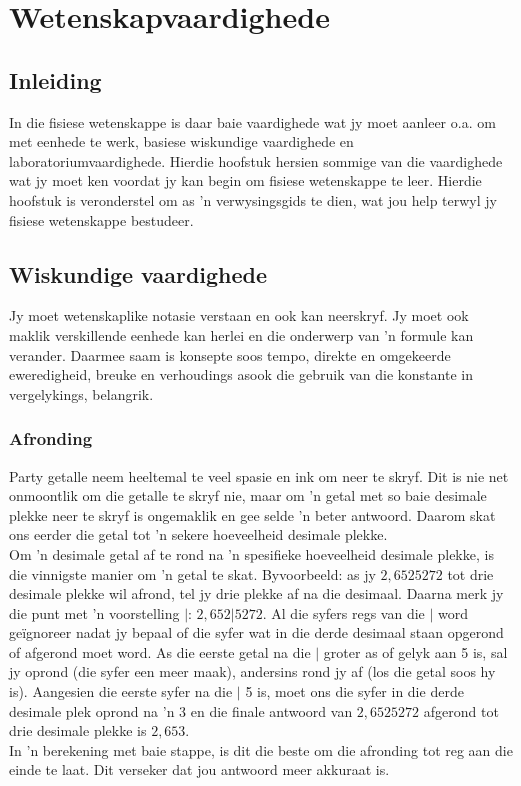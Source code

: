          \chapter{Wetenskapvaardighede}
    \setcounter{figure}{1}\setcounter{subfigure}{1}\label{m30853}
    \section{Inleiding}
            \nopagebreak
In die fisiese wetenskappe is daar baie vaardighede wat jy moet aanleer o.a. om met eenhede te werk, basiese wiskundige vaardighede en laboratoriumvaardighede. Hierdie hoofstuk hersien sommige van die vaardighede wat jy moet ken voordat jy kan begin om fisiese wetenskappe te leer. Hierdie hoofstuk is veronderstel om as  'n verwysingsgids te dien, wat jou help terwyl jy fisiese wetenskappe bestudeer. 
\section{Wiskundige vaardighede}
Jy moet wetenskaplike notasie verstaan en ook kan neerskryf. Jy moet ook maklik verskillende eenhede kan herlei en die onderwerp van  'n formule kan verander. Daarmee saam is konsepte soos tempo, direkte en omgekeerde eweredigheid, breuke en verhoudings asook die gebruik van die konstante in vergelykings, belangrik.  
\subsection*{Afronding}
Party getalle neem heeltemal te veel spasie en ink om neer te skryf. Dit is nie net onmoontlik om die getalle te skryf nie, maar om  'n getal met so baie desimale plekke neer te skryf is ongemaklik en gee selde  'n beter antwoord. Daarom skat ons eerder die getal tot  'n sekere hoeveelheid desimale plekke. \\
Om  'n desimale getal af te rond na  'n spesifieke hoeveelheid desimale plekke, is die vinnigste manier om  'n getal te skat. Byvoorbeeld: as jy $2,6525272$ tot drie desimale plekke wil afrond, tel jy drie plekke af na die desimaal. Daarna merk jy die punt met  'n voorstelling $|$: $2,652|5272$. Al die syfers regs van die $|$ word geïgnoreer nadat jy bepaal of die syfer wat in die derde desimaal staan opgerond of afgerond moet word. As die eerste getal na die $|$ groter as of gelyk aan 5 is, sal jy oprond (die syfer een meer maak), andersins rond jy af (los die getal soos hy is). Aangesien die eerste syfer na die $|$ 5 is, moet ons die syfer in die derde desimale plek oprond na  'n 3 en die finale antwoord van $2,6525272$ afgerond tot drie desimale plekke is $2,653$. \\
In 'n berekening met baie stappe, is dit die beste om die afronding tot reg aan die einde te laat. Dit verseker dat jou antwoord meer akkuraat is.
